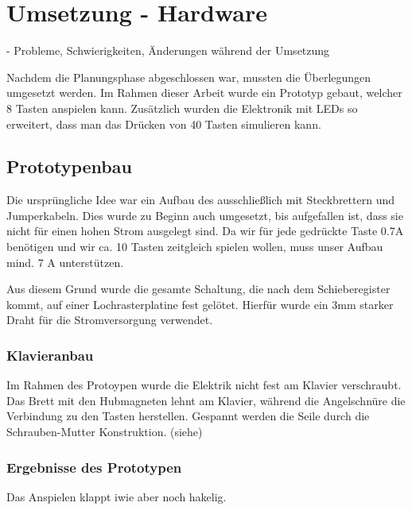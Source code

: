 
\chapter{Umsetzung - Hardware} \label{umsetzungHW}

\nocite{*}
- Probleme, Schwierigkeiten, Änderungen während der Umsetzung

Nachdem die Planungsphase abgeschlossen war, mussten die Überlegungen umgesetzt werden.
Im Rahmen dieser Arbeit wurde ein Prototyp gebaut, welcher 8 Tasten anspielen kann.
Zusätzlich wurden die Elektronik mit LEDs so erweitert, dass man das Drücken von 40 Tasten simulieren kann.

\section{Prototypenbau}

Die ursprüngliche Idee war ein Aufbau des  ausschließlich mit Steckbrettern und Jumperkabeln.
Dies wurde zu Beginn auch umgesetzt, bis aufgefallen ist, dass sie nicht für einen hohen Strom ausgelegt sind.
Da wir für jede gedrückte Taste 0.7A benötigen und wir ca. 10 Tasten zeitgleich spielen wollen, muss unser Aufbau mind. 7 A unterstützen.

Aus diesem Grund wurde die gesamte Schaltung, die nach dem Schieberegister kommt, auf einer Lochrasterplatine fest gelötet.
Hierfür wurde ein 3mm starker Draht für die Stromversorgung verwendet.

\subsection{Klavieranbau}
Im Rahmen des Protoypen wurde die Elektrik nicht fest am Klavier verschraubt.
Das Brett mit den Hubmagneten lehnt am Klavier, während die Angelschnüre die Verbindung zu den Tasten herstellen.
Gespannt werden die Seile durch die Schrauben-Mutter Konstruktion. (siehe)

\subsection{Ergebnisse des Prototypen}

Das Anspielen klappt iwie aber noch hakelig.



